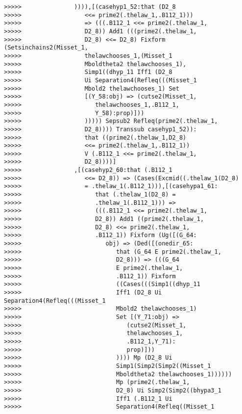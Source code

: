 \documentclass[12pt]{article}
\begin{document}
\begin{verbatim}
>>>>>               )))),[(casehyp1_52:that (D2_8
>>>>>                  <<= prime2(.thelaw_1,.B112_1)))
>>>>>                  => (((.B112_1 <<= prime2(.thelaw_1,
>>>>>                  D2_8)) Add1 (((prime2(.thelaw_1,
>>>>>                  D2_8) <<= D2_8) Fixform (Setsinchains2(Misset_1,
>>>>>                  thelawchooses_1,(Misset_1
>>>>>                  Mboldtheta2 thelawchooses_1),
>>>>>                  Simp1((dhyp_11 Iff1 (D2_8
>>>>>                  Ui Separation4(Refleq(((Misset_1
>>>>>                  Mbold2 thelawchooses_1) Set
>>>>>                  [(Y_58:obj) => (cutse2(Misset_1,
>>>>>                     thelawchooses_1,.B112_1,
>>>>>                     Y_58):prop)]))
>>>>>                  ))))) Sepsub2 Refleq(prime2(.thelaw_1,
>>>>>                  D2_8)))) Transsub casehyp1_52)):
>>>>>                  that ((prime2(.thelaw_1,D2_8)
>>>>>                  <<= prime2(.thelaw_1,.B112_1))
>>>>>                  V (.B112_1 <<= prime2(.thelaw_1,
>>>>>                  D2_8))))]
>>>>>               ,[(casehyp2_60:that (.B112_1
>>>>>                  <<= D2_8)) => (Cases(Excmid((.thelaw_1(D2_8)
>>>>>                  = .thelaw_1(.B112_1))),[(casehypa1_61:
>>>>>                     that (.thelaw_1(D2_8) =
>>>>>                     .thelaw_1(.B112_1))) =>
>>>>>                     (((.B112_1 <<= prime2(.thelaw_1,
>>>>>                     D2_8)) Add1 ((prime2(.thelaw_1,
>>>>>                     D2_8) <<= prime2(.thelaw_1,
>>>>>                     .B112_1)) Fixform (Ug([(G_64:
>>>>>                        obj) => (Ded([(onedir_65:
>>>>>                           that (G_64 E prime2(.thelaw_1,
>>>>>                           D2_8))) => (((G_64
>>>>>                           E prime2(.thelaw_1,
>>>>>                           .B112_1)) Fixform
>>>>>                           ((Cases(((Simp1((dhyp_11
>>>>>                           Iff1 (D2_8 Ui Separation4(Refleq(((Misset_1
>>>>>                           Mbold2 thelawchooses_1)
>>>>>                           Set [(Y_71:obj) =>
>>>>>                              (cutse2(Misset_1,
>>>>>                              thelawchooses_1,
>>>>>                              .B112_1,Y_71):
>>>>>                              prop)]))
>>>>>                           )))) Mp (D2_8 Ui
>>>>>                           Simp1(Simp2(Simp2((Misset_1
>>>>>                           Mboldtheta2 thelawchooses_1))))))
>>>>>                           Mp (prime2(.thelaw_1,
>>>>>                           D2_8) Ui Simp2(Simp2((bhypa3_1
>>>>>                           Iff1 (.B112_1 Ui
>>>>>                           Separation4(Refleq((Misset_1

\end{verbatim}
\end{document}
